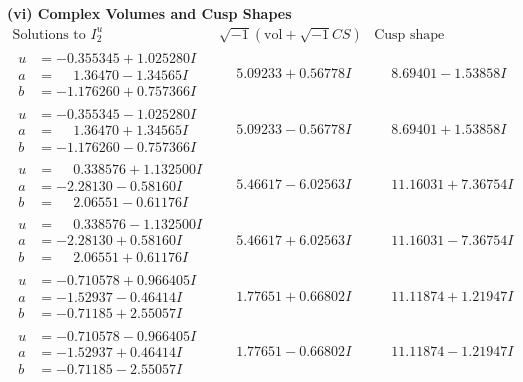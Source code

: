 \documentclass[1p]{elsarticle_modified}
\theoremstyle{definition}
\newcommand{\I}{\sqrt{-1}}
\begin{document}
\newpage\flushleft \textbf{(vi) Complex Volumes and Cusp Shapes}
$$\begin{array}{c|c|c}  
\text{Solutions to }I^u_{2}& \I (\text{vol} + \sqrt{-1}CS) & \text{Cusp shape}\\
 \hline 
\begin{aligned}
u &= -0.355345 + 1.025280 I \\
a &= \phantom{-}1.36470 - 1.34565 I \\
b &= -1.176260 + 0.757366 I\end{aligned}
 & \phantom{-}5.09233 + 0.56778 I & \phantom{-}8.69401 - 1.53858 I \\ \hline\begin{aligned}
u &= -0.355345 - 1.025280 I \\
a &= \phantom{-}1.36470 + 1.34565 I \\
b &= -1.176260 - 0.757366 I\end{aligned}
 & \phantom{-}5.09233 - 0.56778 I & \phantom{-}8.69401 + 1.53858 I \\ \hline\begin{aligned}
u &= \phantom{-}0.338576 + 1.132500 I \\
a &= -2.28130 - 0.58160 I \\
b &= \phantom{-}2.06551 - 0.61176 I\end{aligned}
 & \phantom{-}5.46617 - 6.02563 I & \phantom{-}11.16031 + 7.36754 I \\ \hline\begin{aligned}
u &= \phantom{-}0.338576 - 1.132500 I \\
a &= -2.28130 + 0.58160 I \\
b &= \phantom{-}2.06551 + 0.61176 I\end{aligned}
 & \phantom{-}5.46617 + 6.02563 I & \phantom{-}11.16031 - 7.36754 I \\ \hline\begin{aligned}
u &= -0.710578 + 0.966405 I \\
a &= -1.52937 - 0.46414 I \\
b &= -0.71185 + 2.55057 I\end{aligned}
 & \phantom{-}1.77651 + 0.66802 I & \phantom{-}11.11874 + 1.21947 I \\ \hline\begin{aligned}
u &= -0.710578 - 0.966405 I \\
a &= -1.52937 + 0.46414 I \\
b &= -0.71185 - 2.55057 I\end{aligned}
 & \phantom{-}1.77651 - 0.66802 I & \phantom{-}11.11874 - 1.21947 I \\ \hline\begin{aligned}

\end{aligned}
\end{array}$$
\end{document}

